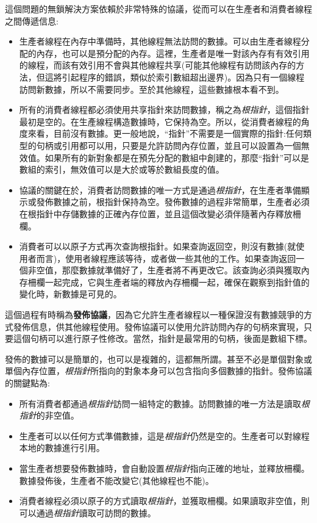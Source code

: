 這個問題的無鎖解決方案依賴於非常特殊的協議，從而可以在生產者和消費者線程之間傳遞信息:

\begin{itemize}
\item 
生產者線程在內存中準備時，其他線程無法訪問的數據。可以由生產者線程分配的內存，也可以是預分配的內存。這裡，生產者是唯一對該內存有有效引用的線程，而該有效引用不會與其他線程共享(可能其他線程有訪問該內存的方法，但這將引起程序的錯誤，類似於索引數組超出邊界)。因為只有一個線程訪問新數據，所以不需要同步。至於其他線程，這些數據根本看不到。

\item 
所有的消費者線程都必須使用共享指針來訪問數據，稱之為\textit{根指針}，這個指針最初是空的。在生產線程構造數據時，它保持為空。所以，從消費者線程的角度來看，目前沒有數據。更一般地說，“指針”不需要是一個實際的指針:任何類型的句柄或引用都可以用，只要是允許訪問內存位置，並且可以設置為一個無效值。如果所有的新對象都是在預先分配的數組中創建的，那麼“指針”可以是數組的索引，無效值可以是大於或等於數組長度的值。

\item 
協議的關鍵在於，消費者訪問數據的唯一方式是通過\textit{根指針}，在生產者準備顯示或發佈數據之前，根指針保持為空。發佈數據的過程非常簡單，生產者必須在根指針中存儲數據的正確內存位置，並且這個改變必須伴隨著內存釋放柵欄。

\item 
消費者可以以原子方式再次查詢根指針。如果查詢返回空，則沒有數據(就使用者而言)，使用者線程應該等待，或者做一些其他的工作。如果查詢返回一個非空值，那麼數據就準備好了，生產者將不再更改它。該查詢必須與獲取內存柵欄一起完成，它與生產者端的釋放內存柵欄一起，確保在觀察到指針值的變化時，新數據是可見的。
\end{itemize}

這個過程有時稱為\textbf{發佈協議}，因為它允許生產者線程以一種保證沒有數據競爭的方式發佈信息，供其他線程使用。發佈協議可以使用允許訪問內存的句柄來實現，只要這個句柄可以進行原子性修改。當然，指針是最常用的句柄，後面是數組下標。

發佈的數據可以是簡單的，也可以是複雜的，這都無所謂。甚至不必是單個對象或單個內存位置，\textit{根指針}所指向的對象本身可以包含指向多個數據的指針。發佈協議的關鍵點為:

\begin{itemize}
\item
所有消費者都通過\textit{根指針}訪問一組特定的數據。訪問數據的唯一方法是讀取\textit{根指針}的非空值。

\item
生產者可以以任何方式準備數據，這是\textit{根指針}仍然是空的。生產者可以對線程本地的數據進行引用。

\item 
當生產者想要發佈數據時，會自動設置\textit{根指針}指向正確的地址，並釋放柵欄。數據發佈後，生產者不能改變它(其他線程也不能)。

\item 
消費者線程必須以原子的方式讀取\textit{根指針}，並獲取柵欄。如果讀取非空值，則可以通過\textit{根指針}讀取可訪問的數據。

\end{itemize}

